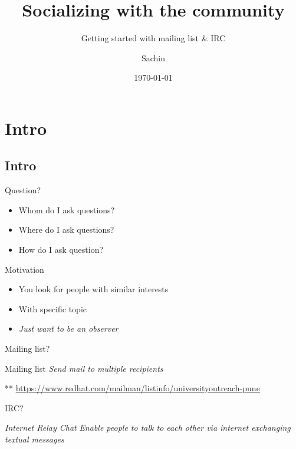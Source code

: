 \documentclass[10pt]{beamer}
\subtitle{Getting started with mailing list \& IRC}
\institute{Red Hat}
\author{Sachin}
\date{\today}
\title{Socializing with the community}
\begin{document}
\maketitle



\section{Intro}
\label{sec:orgd2ddf61}
\subsection{Intro}
\label{sec:org9e893a6}
\begin{frame}[label={sec:orgba37482}]{Question?}
\begin{itemize}
\item Whom do I ask questions?
\item Where do I ask questions?
\item How do I ask question?
\end{itemize}
\end{frame}

\begin{frame}[label={sec:orgf17f014}]{Motivation}
\begin{itemize}
\item You look for people with similar interests
\item With specific topic
\item \emph{Just want to be an observer}
\end{itemize}
\end{frame}

\begin{frame}[label={sec:org0a10c83}]{Mailing list?}
\begin{block}{Mailing list}
\emph{Send mail to multiple recipients}

\alert{**}
	 \url{https://www.redhat.com/mailman/listinfo/universityoutreach-pune}
\end{block}
\end{frame}

\begin{frame}[label={sec:org7edcab4}]{IRC?}
\begin{block}{\emph{Internet Relay Chat}}
\emph{Enable people to talk to each other via \alert{internet} exchanging
 textual messages}
\end{block}
\end{frame}
\end{document}
